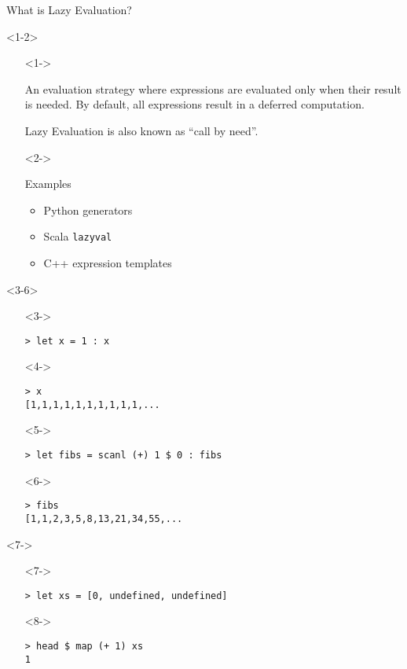 \documentclass{beamer}
\begin{document}
\begin{frame}[fragile]{What is Lazy Evaluation?}
  \begin{onlyenv}<1-2>
    \begin{itemize}
    \item[]<1-> \begin{definition}
        An evaluation strategy where expressions are evaluated only when their
        result is needed. By default, all expressions result in a deferred
        computation.

        Lazy Evaluation is also known as ``call by need''.
      \end{definition}
    \item[]<2-> \begin{block}{Examples}
        \begin{itemize}
        \item Python generators
        \item Scala \texttt{lazyval}
        \item C++ expression templates
        \end{itemize}
      \end{block}
    \end{itemize}
  \end{onlyenv}

  \begin{onlyenv}<3-6>
    \begin{itemize}
    \item[]<3-> \begin{verbatim}
> let x = 1 : x
      \end{verbatim}
    \item[]<4-> \begin{verbatim}
> x
[1,1,1,1,1,1,1,1,1,1,...
      \end{verbatim}
    \item[]<5-> \begin{verbatim}
> let fibs = scanl (+) 1 $ 0 : fibs
      \end{verbatim}
    \item[]<6-> \begin{verbatim}
> fibs
[1,1,2,3,5,8,13,21,34,55,...
      \end{verbatim}
    \end{itemize}
  \end{onlyenv}

  \begin{onlyenv}<7->
    \begin{itemize}
    \item[]<7-> \begin{verbatim}
> let xs = [0, undefined, undefined]
      \end{verbatim}
    \item[]<8-> \begin{verbatim}
> head $ map (+ 1) xs
1
      \end{verbatim}
    \end{itemize}
  \end{onlyenv}
\end{frame}
\end{document}
